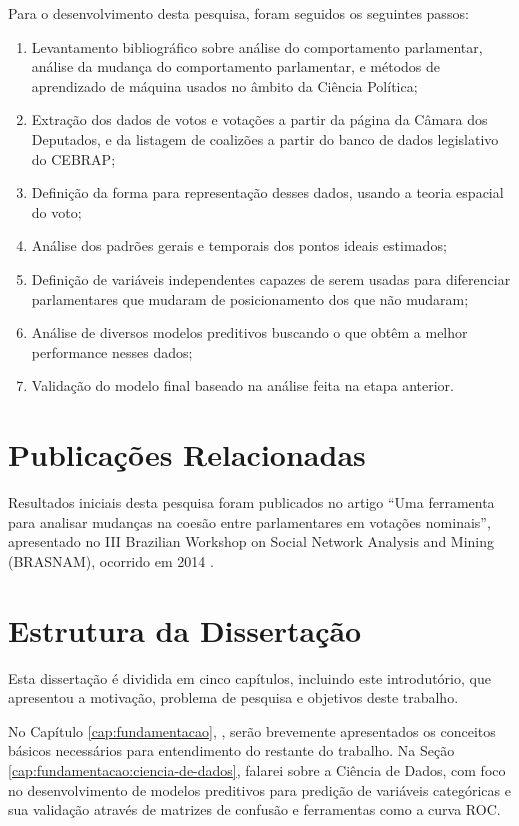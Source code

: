 Para o desenvolvimento desta pesquisa, foram seguidos os seguintes passos:

\begin{enumerate}
  \item Levantamento bibliográfico sobre análise do comportamento parlamentar,
    análise da mudança do comportamento parlamentar, e métodos de aprendizado
    de máquina usados no âmbito da Ciência Política;
  \item Extração dos dados de votos e votações a partir da página da Câmara dos
    Deputados, e da listagem de coalizões a partir do banco de dados
    legislativo do \gls{CEBRAP};
  \item Definição da forma para representação desses dados, usando a teoria
    espacial do voto;
  \item Análise dos padrões gerais e temporais dos pontos ideais estimados;
  \item Definição de variáveis independentes capazes de serem usadas para
    diferenciar parlamentares que mudaram de posicionamento dos que não
    mudaram;
  \item Análise de diversos modelos preditivos buscando o que obtêm a melhor
    performance nesses dados;
  \item Validação do modelo final baseado na análise feita na etapa anterior.
\end{enumerate}

\section{Publicações Relacionadas}

Resultados iniciais desta pesquisa foram publicados no artigo ``Uma ferramenta
para analisar mudanças na coesão entre parlamentares em votações nominais'',
apresentado no III Brazilian Workshop on Social Network Analysis and Mining
(BRASNAM), ocorrido em 2014 \cite{Baptista2014}.

\section{Estrutura da Dissertação}

Esta dissertação é dividida em cinco capítulos, incluindo este introdutório,
que apresentou a motivação, problema de pesquisa e objetivos deste trabalho.

No Capítulo \ref{cap:fundamentacao}, , serão
brevemente apresentados os conceitos básicos necessários para entendimento do
restante do trabalho. Na Seção \ref{cap:fundamentacao:ciencia-de-dados}, falarei
sobre a Ciência de Dados, com foco no desenvolvimento de modelos preditivos
para predição de variáveis categóricas e sua validação através de matrizes de
confusão e ferramentas como a curva \gls{ROC}.

